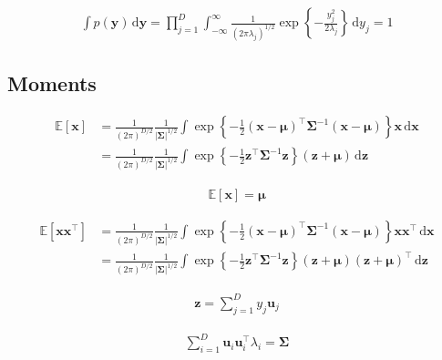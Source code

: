 \documentclass{article}
\begin{document}
\begin{align*}
\int p(\mathbf{y}) \, \mathrm{d} \mathbf{y} = \prod_{j=1}^{D} \int_{-\infty}^{\infty} \frac{1}{\left(2 \pi \lambda_{j}\right)^{1 / 2}} \exp \left\{-\frac{y_{j}^{2}}{2 \lambda_{j}}\right\} \, \mathrm{d} y_{j} = 1 
\tag{3.40}
\end{align*}

\subsection{Moments}

\begin{align*}
\mathbb{E}[\mathbf{x}] 
& = \frac{1}{(2 \pi)^{D / 2}} \frac{1}{|\boldsymbol{\Sigma}|^{1 / 2}} \int \exp \left\{-\frac{1}{2}(\mathbf{x}-\boldsymbol{\mu})^{\top} \boldsymbol{\Sigma}^{-1}(\mathbf{x}-\boldsymbol{\mu})\right\} \mathbf{x} \, \mathrm{d} \mathbf{x} \\
& = \frac{1}{(2 \pi)^{D / 2}} \frac{1}{|\boldsymbol{\Sigma}|^{1 / 2}} \int \exp \left\{-\frac{1}{2} \mathbf{z}^{\top} \boldsymbol{\Sigma}^{-1} \mathbf{z}\right\} (\mathbf{z} + \boldsymbol{\mu}) \, \mathrm{d} \mathbf{z}
\tag{3.41}
\end{align*}

\begin{align*}
\mathbb{E}[\mathbf{x}] 
= \boldsymbol{\mu}
\tag{3.42}
\end{align*}

\begin{align*}
\mathbb{E}\left[\mathbf{x} \mathbf{x}^{\top}\right] 
& = \frac{1}{(2 \pi)^{D / 2}} \frac{1}{|\boldsymbol{\Sigma}|^{1 / 2}} \int \exp \left\{-\frac{1}{2}(\mathbf{x}-\boldsymbol{\mu})^{\top} \boldsymbol{\Sigma}^{-1}(\mathbf{x}-\boldsymbol{\mu})\right\} \mathbf{x} \mathbf{x}^{\top} \, \mathrm{d} \mathbf{x} \\
& = \frac{1}{(2 \pi)^{D / 2}} \frac{1}{|\boldsymbol{\Sigma}|^{1 / 2}} \int \exp \left\{-\frac{1}{2} \mathbf{z}^{\top} \boldsymbol{\Sigma}^{-1} \mathbf{z}\right\} (\mathbf{z} + \boldsymbol{\mu})(\mathbf{z} + \boldsymbol{\mu})^{\top} \, \mathrm{d} \mathbf{z}
\tag{3.43}
\end{align*}

\begin{align*}
\mathbf{z} = \sum_{j=1}^{D} y_{j} \mathbf{u}_{j} 
\tag{3.44}
\end{align*}

\begin{align*}
\sum_{i=1}^{D} \mathbf{u}_{i} \mathbf{u}_{i}^{\top} \lambda_{i} = \boldsymbol{\Sigma}
\tag{3.45}
\end{align*}
\end{document}
